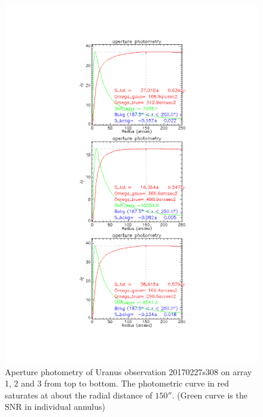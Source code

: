 \begin{figure}
\begin{center}
  \includegraphics[clip, angle=0, scale=0.4]{Figures/Uranus_s308.pdf}
  \caption{Aperture photometry of Uranus observation 20170227s308  on array 1, 2 and 3 from top to bottom.
    The photometric curve in red saturates at about the radial distance of $150''$.
    (Green curve is the SNR in individual annulus)}
\label{fig:PhAp}
\end{center}
\end{figure}

